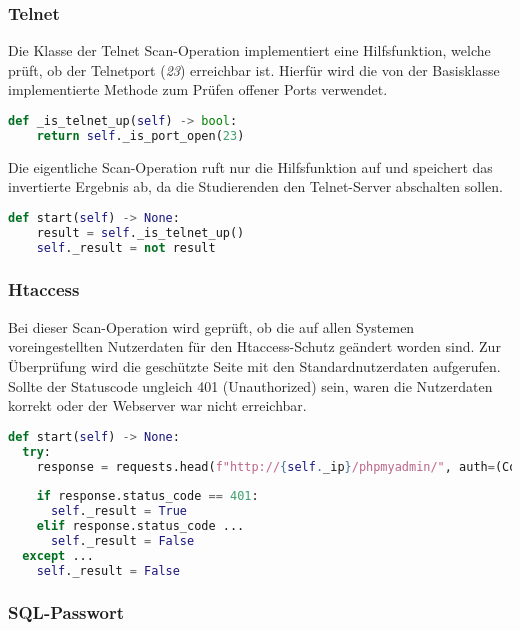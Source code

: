 \subsubsection{Telnet}
Die Klasse der Telnet Scan-Operation implementiert eine Hilfsfunktion, welche prüft, ob der Telnetport (\textit{23}) erreichbar ist. Hierfür wird die von der Basisklasse implementierte Methode zum Prüfen offener Ports verwendet.

\begin{lstlisting}[language=Python, frame=single, caption={Big Brother Telnet}, captionpos=b, label={lst:bigbrother-telnet}]
def _is_telnet_up(self) -> bool:
	return self._is_port_open(23)
\end{lstlisting}

Die eigentliche Scan-Operation ruft nur die Hilfsfunktion auf und speichert das invertierte Ergebnis ab, da die Studierenden den Telnet-Server abschalten sollen.

\begin{lstlisting}[language=Python, frame=single, caption={Big Brother Telnet}, captionpos=b, label={lst:bigbrother-telnet-start}]
def start(self) -> None:
	result = self._is_telnet_up()
	self._result = not result
\end{lstlisting}

\subsubsection{Htaccess}

Bei dieser Scan-Operation wird geprüft, ob die auf allen Systemen voreingestellten Nutzerdaten für den Htaccess-Schutz geändert worden sind. Zur Überprüfung wird die geschützte Seite mit den Standardnutzerdaten aufgerufen. Sollte der Statuscode ungleich 401 (Unauthorized) sein, waren die Nutzerdaten korrekt oder der Webserver war nicht erreichbar.
\begin{lstlisting}[language=Python, frame=single, caption={Big Brother Htaccess}, captionpos=b, label={lst:bigbrother-htaccess}]
def start(self) -> None:
  try:
    response = requests.head(f"http://{self._ip}/phpmyadmin/", auth=(Config.operations['htaccess']['username'], Config.operations['htaccess']['password']))
    
    if response.status_code == 401:
      self._result = True
    elif response.status_code ...
      self._result = False
  except ...
    self._result = False
\end{lstlisting}

\subsubsection{SQL-Passwort}

